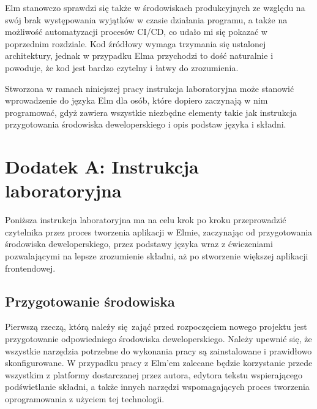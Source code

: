 \documentclass[twoside,a4paper]{report}
\begin{document}
Elm stanowczo sprawdzi się także w środowiskach produkcyjnych ze względu na swój brak występowania wyjątków w czasie działania programu, a także na możliwość automatyzacji procesów CI/CD, co udało mi się pokazać w poprzednim rozdziale.
Kod źródłowy wymaga trzymania się ustalonej architektury, jednak w przypadku Elma przychodzi to dość naturalnie i powoduje, że kod jest bardzo czytelny i łatwy do zrozumienia.

Stworzona w ramach niniejszej pracy instrukcja laboratoryjna może stanowić wprowadzenie do języka Elm dla osób, które dopiero zaczynają w nim programować, gdyż zawiera wszystkie niezbędne elementy takie jak instrukcja przygotowania środowiska deweloperskiego i opis podstaw języka i składni.

\listoffigures
{}
\lstlistoflistings{}
\printbibliography{}


\chapter*{Dodatek {A}: Instrukcja laboratoryjna}
Poniższa instrukcja laboratoryjna ma na celu krok po kroku przeprowadzić czytelnika przez proces tworzenia aplikacji w Elmie, zaczynając od przygotowania środowiska deweloperskiego, przez podstawy języka wraz z ćwiczeniami pozwalającymi na lepsze zrozumienie składni, aż po stworzenie większej aplikacji frontendowej.

\section*{Przygotowanie środowiska}
Pierwszą rzeczą, którą należy się zająć przed rozpoczęciem nowego projektu jest przygotowanie odpowiedniego środowiska deweloperskiego.
Należy upewnić się, że wszystkie narzędzia potrzebne do wykonania pracy są zainstalowane i prawidłowo skonfigurowane.
W przypadku pracy z Elm'em zalecane będzie korzystanie przede wszystkim z platformy dostarczanej przez autora, edytora tekstu wspierającego podświetlanie składni, a także innych narzędzi wspomagających proces tworzenia oprogramowania z użyciem tej technologii.
\end{document}
